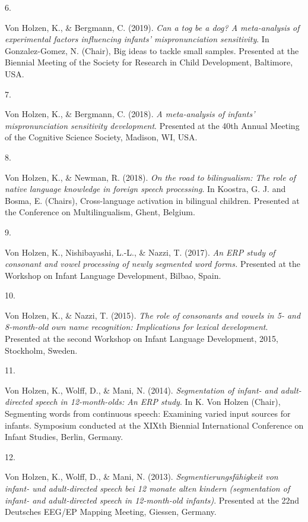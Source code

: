 \documentclass[10pt,a4paper,]{article}
\newlength{\cslhangindent}
\newlength{\csllabelwidth}
\newcommand{\CSLLeftMargin}[1]{\parbox[t]{\csllabelwidth}{\hfill #1~}}
\newcommand{\CSLRightInline}[1]{\parbox[t]{\linewidth - \cslhangindent - \csllabelwidth}{#1}\vspace{0.8ex}}
\begin{document}
\leavevmode{}%
\CSLLeftMargin{6. }%
\CSLRightInline{Von Holzen, K., \& Bergmann, C. (2019). \emph{Can a tog
be a dog? A meta-analysis of experimental factors influencing infants'
mispronunciation sensitivity}. In Gonzalez-Gomez, N. (Chair), Big ideas
to tackle small samples. Presented at the Biennial Meeting of the
Society for Research in Child Development, Baltimore, USA.}

\leavevmode{}%
\CSLLeftMargin{7. }%
\CSLRightInline{Von Holzen, K., \& Bergmann, C. (2018). \emph{A
meta-analysis of infants' mispronunciation sensitivity development}.
Presented at the 40th Annual Meeting of the Cognitive Science Society,
Madison, WI, USA.}

\leavevmode{}%
\CSLLeftMargin{8. }%
\CSLRightInline{Von Holzen, K., \& Newman, R. (2018). \emph{On the road
to bilingualism: The role of native language knowledge in foreign speech
processing}. In Koostra, G. J. and Bosma, E. (Chairs), Cross-language
activation in bilingual children. Presented at the Conference on
Multilingualism, Ghent, Belgium.}

\leavevmode{}%
\CSLLeftMargin{9. }%
\CSLRightInline{Von Holzen, K., Nishibayashi, L.-L., \& Nazzi, T.
(2017). \emph{An ERP study of consonant and vowel processing of newly
segmented word forms.} Presented at the Workshop on Infant Language
Development, Bilbao, Spain.}

\leavevmode{}%
\CSLLeftMargin{10. }%
\CSLRightInline{Von Holzen, K., \& Nazzi, T. (2015). \emph{The role of
consonants and vowels in 5- and 8-month-old own name recognition:
Implications for lexical development}. Presented at the second Workshop
on Infant Language Development, 2015, Stockholm, Sweden.}

\leavevmode{}%
\CSLLeftMargin{11. }%
\CSLRightInline{Von Holzen, K., Wolff, D., \& Mani, N. (2014).
\emph{Segmentation of infant- and adult-directed speech in
12-month-olds: An ERP study}. In K. Von Holzen (Chair), Segmenting words
from continuous speech: Examining varied input sources for infants.
Symposium conducted at the XIXth Biennial International Conference on
Infant Studies, Berlin, Germany.}

\leavevmode{}%
\CSLLeftMargin{12. }%
\CSLRightInline{Von Holzen, K., Wolff, D., \& Mani, N. (2013).
\emph{Segmentierungsfähigkeit von infant- und adult-directed speech bei
12 monate alten kindern (segmentation of infant- and adult-directed
speech in 12-month-old infants)}. Presented at the 22nd Deutsches EEG/EP
Mapping Meeting, Giessen, Germany.}
\end{document}

